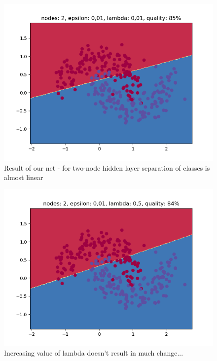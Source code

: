 \documentclass[3p,twocolumn]{elsarticle}
\begin{document}
\begin{figure}[h]
\label{fig:fig4}
  \includegraphics[width=\linewidth]{wykresy/1.png}
	\caption{Result of our net - for two-node hidden layer separation of classes is almost linear}
	\label{fig4}
\end{figure}

\begin{figure}[h]
\label{fig:fig4}
  \includegraphics[width=\linewidth]{wykresy/2.png}
	\caption{Increasing value of lambda doesn't result in much change...}
	\label{fig4}
\end{figure}
\end{document}
